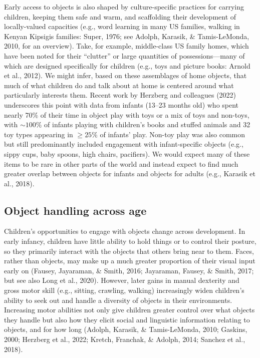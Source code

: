 \documentclass[10pt, letterpaper]{article}
\begin{document}
Early access to objects is also shaped by culture-specific practices for
carrying children, keeping them safe and warm, and scaffolding their
development of locally-valued capacities (e.g., word learning in many US
families, walking in Kenyan Kipsigis families: Super, 1976; see Adolph,
Karasik, \& Tamis-LeMonda, 2010, for an overview). Take, for example,
middle-class US family homes, which have been noted for their
``clutter'' or large quantities of possessions---many of which are
designed specifically for children (e.g., toys and picture books: Arnold
et al., 2012). We might infer, based on these assemblages of home
objects, that much of what children do and talk about at home is
centered around what particularly interests them. Recent work by
Herzberg and colleagues (2022) underscores this point with data from
infants (13--23 months old) who spent nearly 70\% of their time in
object play with toys or a mix of toys and non-toys, with
\({\sim}100\%\) of infants playing with children's books and stuffed
animals and 32 toy types appearing in \({\ge}25\%\) of infants' play.
Non-toy play was also common but still predominantly included engagement
with infant-specific objects (e.g., sippy cups, baby spoons, high
chairs, pacifiers). We would expect many of these items to be rare in
other parts of the world and instead expect to find much greater overlap
between objects for infants and objects for adults (e.g., Karasik et
al., 2018).

\hypertarget{object-handling-across-age}{%
\subsection{Object handling across
age}\label{object-handling-across-age}}

Children's opportunities to engage with objects change across
development. In early infancy, children have little ability to hold
things or to control their posture, so they primarily interact with the
objects that others bring near to them. Faces, rather than objects, may
make up a much greater proportion of their visual input early on
(Fausey, Jayaraman, \& Smith, 2016; Jayaraman, Fausey, \& Smith, 2017;
but see also Long et al., 2020). However, later gains in manual
dexterity and gross motor skill (e.g., sitting, crawling, walking)
increasingly widen children's ability to seek out and handle a diversity
of objects in their environments. Increasing motor abilities not only
give children greater control over what objects they handle but also how
they elicit social and linguistic information relating to objects, and
for how long (Adolph, Karasik, \& Tamis-LeMonda, 2010; Gaskins, 2000;
Herzberg et al., 2022; Kretch, Franchak, \& Adolph, 2014; Sanchez et
al., 2018).
\end{document}
